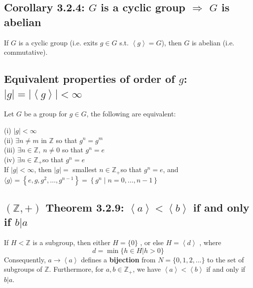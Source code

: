 \documentclass[11pt]{elegantbook}
\begin{document}
\subsection{Corollary 3.2.4: $G$ is a cyclic group $\Rightarrow	$ $G$ is abelian}
\begin{corollary}[Corollary 3.2.4]
    If $G$ is a cyclic group (i.e. exits $g\in G$ s.t. $\left\langle g\right\rangle=G$), then $G$ is abelian (i.e. commutative).
\end{corollary}

\subsection{Equivalent properties of order of $g$: $|g|=|\left\langle g\right\rangle|<\infty$}
\begin{proposition}[Proposition 3.2.6]
    Let $G$ be a group for $g \in G$, the
    following are equivalent:
\end{proposition}
(i) $|g|<\infty$\\
(ii) $\exists n \neq m$ in $\mathbb{Z}$ so that $g^{n}=g^{m}$\\
(iii) $\exists n \in \mathbb{Z},\ n\neq 0$ so that $g^{n}=e$\\
(iv) $\exists n \in \mathbb{Z}_{+}$so that $g^{n}=e$\\
If $|g|<\infty$, then $|g|=$ smallest $n \in \mathbb{Z}_{+}$so that $g^{n}=e$, and $\langle g\rangle=\left\{e, g, g^{2}, \ldots, g^{n-1}\right\}=\left\{g^{n} \mid n=0, \ldots, n-1\right\}$

\subsection{$(\mathbb{Z},+)$ Theorem 3.2.9: $\left\langle a\right\rangle <\left\langle b\right\rangle$ if and only if $b|a$}
\begin{theorem}[Theorem 3.2.9]
    If $H < \mathbb{Z}$ is a subgroup, then either $H = \{ 0 \}$ , or else $H=\left\langle d\right\rangle$ , where $$d = \min \{ h \in H | h > 0 \}$$
    Consequently, $a \rightarrow \left\langle a\right\rangle$ deﬁnes a \textbf{bijection} from $N = \{ 0, 1, 2, . . . \}$ to the set of subgroups of $\mathbb{Z}$. Furthermore,
    for $a,b\in \mathbb{Z}_{+}$, we have $\left\langle a\right\rangle <\left\langle b\right\rangle$ if and only if $b|a$.
\end{theorem}
\end{document}
